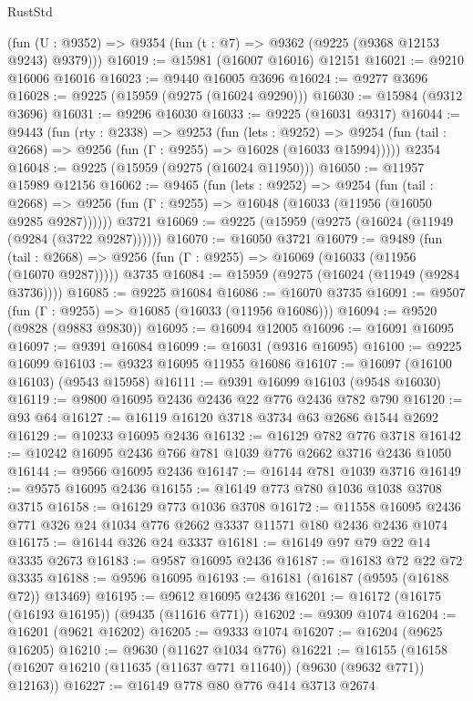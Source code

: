 \begin{lexlean}{RustStd}
\begin{coremodule}
    (fun (U : @9352) => @9354 (fun (t : @7) => @9362 (@9225 (@9368 @12153 @9243) @9379)))
@16019 := @15981 (@16007 @16016) @12151
@16021 := @9210 @16006 @16016
@16023 := @9440 @16005 @3696
@16024 := @9277 @3696
@16028 := @9225 (@15959 (@9275 (@16024 @9290)))
@16030 := @15984 (@9312 @3696)
@16031 := @9296 @16030
@16033 := @9225 (@16031 @9317)
@16044 := @9443
    (fun (rty : @2338) =>
    @9253
      (fun (lets : @9252) =>
      @9254 (fun (tail : @2668) => @9256 (fun (Γ : @9255) => @16028 (@16033 @15994)))))
    @2354
@16048 := @9225 (@15959 (@9275 (@16024 @11950)))
@16050 := @11957 @15989 @12156
@16062 := @9465
    (fun (lets : @9252) =>
    @9254
      (fun (tail : @2668) =>
      @9256 (fun (Γ : @9255) => @16048 (@16033 (@11956 (@16050 @9285 @9287))))))
    @3721
@16069 := @9225 (@15959 (@9275 (@16024 (@11949 (@9284 (@3722 @9287))))))
@16070 := @16050 @3721
@16079 := @9489
    (fun (tail : @2668) => @9256 (fun (Γ : @9255) => @16069 (@16033 (@11956 (@16070 @9287)))))
    @3735
@16084 := @15959 (@9275 (@16024 (@11949 (@9284 @3736))))
@16085 := @9225 @16084
@16086 := @16070 @3735
@16091 := @9507 (fun (Γ : @9255) => @16085 (@16033 (@11956 @16086)))
@16094 := @9520 (@9828 (@9883 @9830))
@16095 := @16094 @12005
@16096 := @16091 @16095
@16097 := @9391 @16084
@16099 := @16031 (@9316 @16095)
@16100 := @9225 @16099
@16103 := @9323 @16095 @11955 @16086
@16107 := @16097 (@16100 @16103) (@9543 @15958)
@16111 := @9391 @16099 @16103 (@9548 @16030)
@16119 := @9800 @16095 @2436 @2436 @22 @776 @2436 @782 @790
@16120 := @93 @64
@16127 := @16119 @16120 @3718 @3734 @63 @2686 @1544 @2692
@16129 := @10233 @16095 @2436
@16132 := @16129 @782 @776 @3718
@16142 := @10242 @16095 @2436 @766 @781 @1039 @776 @2662 @3716 @2436 @1050
@16144 := @9566 @16095 @2436
@16147 := @16144 @781 @1039 @3716
@16149 := @9575 @16095 @2436
@16155 := @16149 @773 @780 @1036 @1038 @3708 @3715
@16158 := @16129 @773 @1036 @3708
@16172 := @11558 @16095 @2436 @771 @326 @24 @1034 @776 @2662 @3337 @11571 @180 @2436 @2436 @1074
@16175 := @16144 @326 @24 @3337
@16181 := @16149 @97 @79 @22 @14 @3335 @2673
@16183 := @9587 @16095 @2436
@16187 := @16183 @72 @22 @72 @3335
@16188 := @9596 @16095
@16193 := @16181 (@16187 (@9595 (@16188 @72)) @13469)
@16195 := @9612 @16095 @2436
@16201 := @16172 (@16175 (@16193 @16195)) (@9435 (@11616 @771))
@16202 := @9309 @1074
@16204 := @16201 (@9621 @16202)
@16205 := @9333 @1074
@16207 := @16204 (@9625 @16205)
@16210 := @9630 (@11627 @1034 @776)
@16221 := @16155 (@16158 (@16207 @16210 (@11635 (@11637 @771 @11640)) (@9630 (@9632 @771)) @12163))
@16227 := @16149 @778 @80 @776 @414 @3713 @2674

\end{coremodule}
\end{lexlean}

